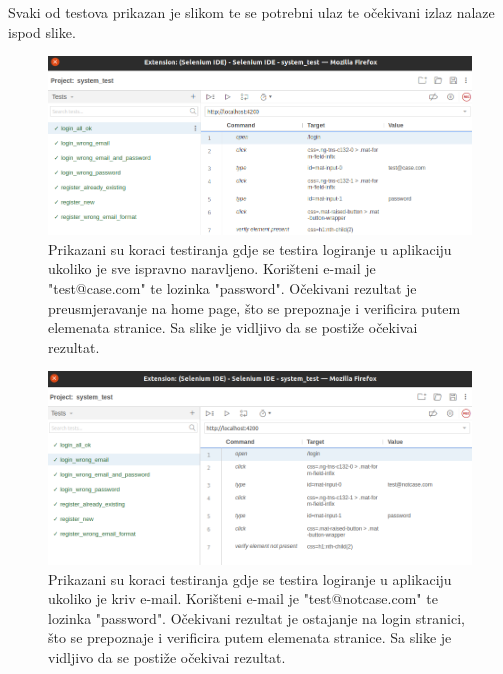         Svaki od testova prikazan je slikom te se potrebni ulaz te očekivani izlaz nalaze ispod slike.
        
			\eject 

           \begin{figure}[H]
                \includegraphics[width=\textwidth]{slike/tests_system/login_all_ok.png} %
                \caption{Prikazani su koraci testiranja gdje se testira logiranje u aplikaciju ukoliko je sve ispravno naravljeno. Korišteni e-mail je "test@case.com" te lozinka "password". Očekivani rezultat je preusmjeravanje na home page, što se prepoznaje i verificira putem elemenata stranice. Sa slike je vidljivo da se postiže očekivai rezultat.}
                \label{fig:struktura} %
            \end{figure}

            \begin{figure}[H]
                \includegraphics[width=\textwidth]{slike/tests_system/login_wrong_email.png} %
                \caption{Prikazani su koraci testiranja gdje se testira logiranje u aplikaciju ukoliko je kriv e-mail. Korišteni e-mail je "test@notcase.com" te lozinka "password". Očekivani rezultat je ostajanje na login stranici, što se prepoznaje i verificira putem elemenata stranice. Sa slike je vidljivo da se postiže očekivai rezultat.}
                \label{fig:struktura} %
            \end{figure}

